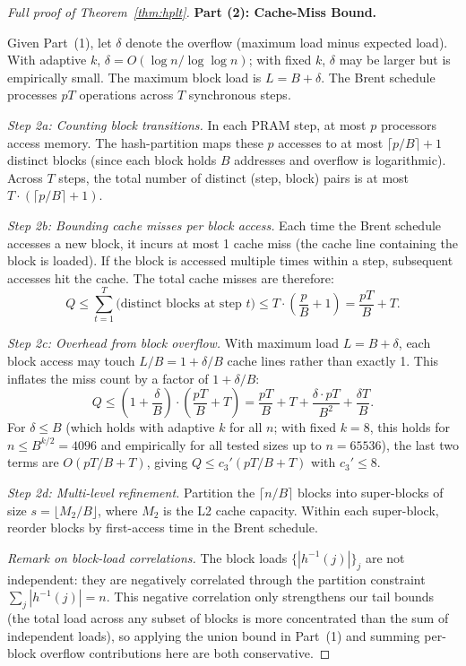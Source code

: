 \documentclass[11pt]{article}
\begin{document}
\begin{proof}[Full proof of Theorem~\ref{thm:hplt}]
\medskip
\textbf{Part (2): Cache-Miss Bound.}

Given Part~(1), let $\delta$ denote the overflow (maximum load minus
expected load).  With adaptive $k$, $\delta = O(\log n / \log\log n)$;
with fixed $k$, $\delta$ may be larger but is empirically small.
The maximum block load is $L = B + \delta$.
The Brent schedule processes $pT$ operations across $T$ synchronous steps.

\emph{Step 2a: Counting block transitions.}
In each PRAM step, at most $p$ processors access memory.  The hash-partition
maps these $p$ accesses to at most $\lceil p/B \rceil + 1$ distinct blocks
(since each block holds $B$ addresses and overflow is logarithmic).
Across $T$ steps, the total number of distinct (step, block) pairs is at
most $T \cdot (\lceil p/B \rceil + 1)$.

\emph{Step 2b: Bounding cache misses per block access.}
Each time the Brent schedule accesses a new block, it incurs at most 1 cache
miss (the cache line containing the block is loaded).  If the block is
accessed multiple times within a step, subsequent accesses hit the cache.
The total cache misses are therefore:
\[
  Q \le \sum_{t=1}^{T} \text{(distinct blocks at step $t$)}
    \le T \cdot \left(\frac{p}{B} + 1\right)
    = \frac{pT}{B} + T.
\]

\emph{Step 2c: Overhead from block overflow.}
With maximum load $L = B + \delta$,
each block access may touch $L/B = 1 + \delta/B$ cache lines rather than
exactly 1.  This inflates the miss count by a factor of $1 + \delta/B$:
\[
  Q \le \left(1 + \frac{\delta}{B}\right) \cdot \left(\frac{pT}{B} + T\right)
    = \frac{pT}{B} + T + \frac{\delta \cdot pT}{B^2} + \frac{\delta T}{B}.
\]
For $\delta \le B$ (which holds with adaptive $k$ for all $n$; with
fixed $k = 8$, this holds for $n \le B^{k/2} = 4096$ and empirically
for all tested sizes up to $n = 65536$), the last two terms are
$O(pT/B + T)$, giving $Q \le c_3' (pT/B + T)$ with $c_3' \le 8$.

\emph{Step 2d: Multi-level refinement.}
Partition the $\lceil n/B \rceil$ blocks into super-blocks of size
$s = \lfloor M_2 / B \rfloor$, where $M_2$ is the L2 cache capacity.
Within each super-block, reorder blocks by first-access time in the Brent
schedule.

\emph{Remark on block-load correlations.}
The block loads $\{|h^{-1}(j)|\}_j$ are not independent: they are
negatively correlated through the partition constraint $\sum_j |h^{-1}(j)| = n$.
This negative correlation only strengthens our tail bounds (the total load
across any subset of blocks is more concentrated than the sum of
independent loads), so applying the union bound in Part~(1) and summing
per-block overflow contributions here are both conservative.


\end{proof}
\end{document}
